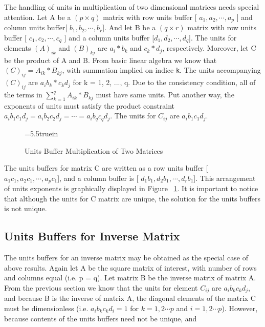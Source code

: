\vspace{0.15 in}
\noindent\hspace{0.5 in}
The handling of units in multiplication of two
dimensional matrices needs special attention. 
Let A be a $(p \times q)$ matrix with row units
buffer [ $ a_1, a_2, \cdots, a_p $ ] and column units buffer[ $ b_1, b_2, \cdots, b_r $].
And let B be a $(q \times r)$ matrix with row units buffer
[ $ c_1, c_2, \cdots, c_q $ ] and a column units buffer [$ d_1, d_2, \cdots, d_q $].
The units for elements $(A)_{ik}$ and $(B)_{kj}$
are $ a_i*b_k $ and $ c_k*d_j $, respectively.
Moreover, let C be the product of A and B. From basic linear algebra
we know that $(C)_{ij} = A_{ik}*B_{kj}$, with summation implied on indice {\tt k}.
The units accompanying $ (C)_{ij} $ are $a_i b_k * c_k d_j$ for k = 1, 2, ..., q.
Due to the consistency condition, all of the terms in 
$\sum_{k = 1}^q A_{ik}*B_{kj}$ must have same units.
Put another way, the exponents of units must satisfy the product constraint
$a_i b_1 c_1 d_j = a_i b_2 c_2 d_j = \cdots = a_i b_q c_q d_j $.
The units for $ C_{ij} $ are $ a_i b_1 c_1 d_j $.

\begin{figure}[h]
\epsfxsize=5.5truein
\centerline{}
\caption{Units Buffer Multiplication of Two Matrices}
\label{fig: M_Mult}
\end{figure}

\vspace{0.15 in}\noindent
The units buffers for matrix C are written as a
row units buffer [ $ a_1c_1, a_2 c_1, \cdots, a_p c_1 $],
and a column buffer is [ $ d_1b_1, d_2 b_1, \cdots, d_r b_1 $].
This arrangement of units exponents is graphically displayed in Figure ~\ref{fig: M_Mult}.
It is important to notice that although the units for C matrix are unique,
the solution for the units buffers is not unique.

\subsection{Units Buffers for Inverse Matrix}

\vspace{0.15 in}
\noindent\hspace{0.5 in}
The units buffers for an inverse matrix may be
obtained as the special case of above results.
Again let A be the square matrix of interest,
with number of rows and columns equal (i.e. p = q).
Let matrix B be the inverse matrix of matrix A. From the previous section
we know that the units for element $ C_{ij} $ are $ a_i b_k c_k d_j $,
and because B is the inverse of matrix A,
the diagonal elements of the matrix C must be dimensionless
(i.e. $a_i b_k c_k d_i = 1$ for $k = 1,2 \cdots p$ and $i = 1,2 \cdots p$).
However, because contents of the units buffers need not be unique, and

